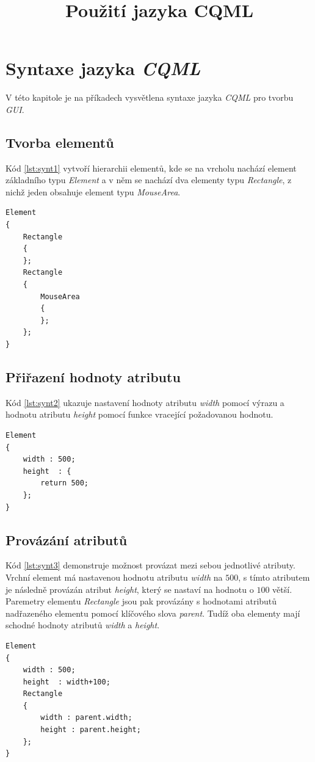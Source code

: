 \documentclass{article}
\begin{document}
\title{Použití jazyka CQML}
\date{}
\maketitle


\section{\label{CH:APF}Syntaxe jazyka \textit{CQML}}
V této kapitole je na příkadech vysvětlena syntaxe jazyka \textit{CQML} pro tvorbu \textit{GUI}.

\subsection{Tvorba elementů}
Kód \ref{lst:synt1} vytvoří hierarchii elementů, kde se na vrcholu nachází element základního typu \textit{Element} a v něm se nachází dva elementy typu \textit{Rectangle}, z nichž jeden obsahuje element typu \textit{MouseArea}.
\begin{lstlisting}[frame=single,caption=Syntaxe pro tvorbu hierarchie elementů.,label=lst:synt1]
Element
{
	Rectangle
	{
	};
	Rectangle
	{
		MouseArea
		{
		};
	};
}
\end{lstlisting}

\subsection{Přiřazení hodnoty atributu}
Kód \ref{lst:synt2} ukazuje nastavení hodnoty atributu \textit{width} pomocí výrazu a hodnotu atributu \textit{height} pomocí funkce vracející požadovanou hodnotu.
\begin{lstlisting}[float,frame=single,caption=Syntaxe přiřazení hodnoty elementu pomocí výrazu nebo funkce.,label=lst:synt2]
Element
{
	width : 500;
	height  : {
		return 500;
	};
}
\end{lstlisting}

\subsection{Provázání atributů}
Kód \ref{lst:synt3} demonstruje možnost provázat mezi sebou jednotlivé atributy. Vrchní element má nastavenou hodnotu atributu \textit{width} na $500$, s tímto atributem je následně provázán atribut \textit{height}, který se nastaví na hodnotu o $100$ větší. Paremetry elementu \textit{Rectangle} jsou pak provázány s hodnotami atributů nadřazeného elementu pomocí klíčového slova \textit{parent}. Tudíž oba elementy mají schodné hodnoty atributů \textit{width} a \textit{height}.
\begin{lstlisting}[frame=single,caption=Ukázka provázání atributů mezi sebou.,label=lst:synt3]
Element
{
	width : 500;
	height  : width+100;
	Rectangle
	{
		width : parent.width;
		height : parent.height;
	};
}
\end{lstlisting}
\end{document}
